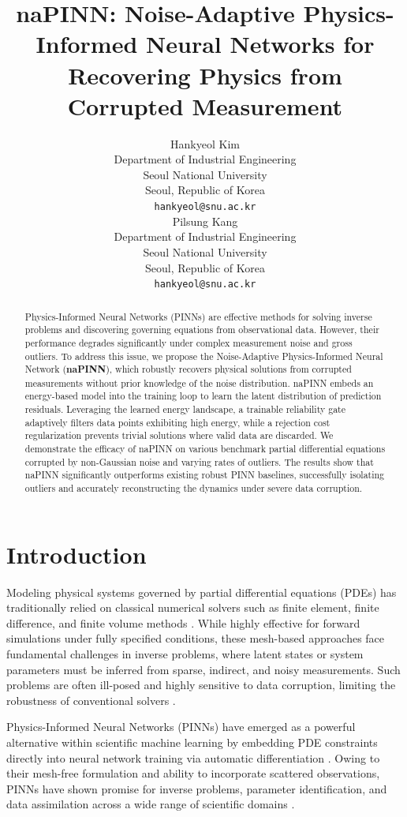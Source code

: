 \documentclass{article}
\title{naPINN: Noise-Adaptive Physics-Informed Neural Networks for Recovering Physics from Corrupted Measurement}
\author{%
  Hankyeol Kim \\
  Department of Industrial Engineering\\
  Seoul National University\\
  Seoul, Republic of Korea \\
  \texttt{hankyeol@snu.ac.kr} \\
  \And
  Pilsung Kang \\
Department of Industrial Engineering\\
  Seoul National University\\
  Seoul, Republic of Korea \\
  \texttt{hankyeol@snu.ac.kr} \\
}
\theoremstyle{plain}
\theoremstyle{definition}
\theoremstyle{remark}
\begin{document}
\maketitle

\begin{abstract}
    Physics-Informed Neural Networks (PINNs) are effective methods for solving inverse problems and discovering governing equations from observational data. However, their performance degrades significantly under complex measurement noise and gross outliers. To address this issue, we propose the Noise-Adaptive Physics-Informed Neural Network (\textbf{naPINN}), which robustly recovers physical solutions from corrupted measurements without prior knowledge of the noise distribution. naPINN embeds an energy-based model into the training loop to learn the latent distribution of prediction residuals. Leveraging the learned energy landscape, a trainable reliability gate adaptively filters data points exhibiting high energy, while a rejection cost regularization prevents trivial solutions where valid data are discarded. We demonstrate the efficacy of naPINN on various benchmark partial differential equations corrupted by non-Gaussian noise and varying rates of outliers. The results show that naPINN significantly outperforms existing robust PINN baselines, successfully isolating outliers and accurately reconstructing the dynamics under severe data corruption.
\end{abstract}

\section{Introduction}
\label{sec:introduction}

Modeling physical systems governed by partial differential equations (PDEs) has traditionally relied on classical numerical solvers such as finite element, finite difference, and finite volume methods \cite{FEM-book, FDM-book}. While highly effective for forward simulations under fully specified conditions, these mesh-based approaches face fundamental challenges in inverse problems, where latent states or system parameters must be inferred from sparse, indirect, and noisy measurements. Such problems are often ill-posed and highly sensitive to data corruption, limiting the robustness of conventional solvers \cite{CptlMethods-Book, StatCom-Book}.

Physics-Informed Neural Networks (PINNs) have emerged as a powerful alternative within scientific machine learning by embedding PDE constraints directly into neural network training via automatic differentiation \cite{Raissi2019, Baydin2018}. Owing to their mesh-free formulation and ability to incorporate scattered observations, PINNs have shown promise for inverse problems, parameter identification, and data assimilation across a wide range of scientific domains \cite{Karniadakis2021}.
\end{document}
